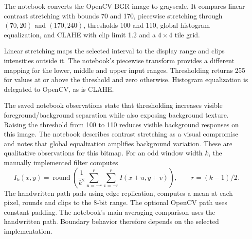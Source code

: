 The notebook converts the OpenCV BGR image to grayscale. It compares linear contrast stretching with bounds 70 and 170, piecewise stretching through $(70,20)$ and $(170,240)$, thresholds 100 and 110, global histogram equalization, and CLAHE with clip limit 1.2 and a $4\times4$ tile grid.

Linear stretching maps the selected interval to the display range and clips intensities outside it. The notebook's piecewise transform provides a different mapping for the lower, middle and upper input ranges. Thresholding returns 255 for values at or above the threshold and zero otherwise. Histogram equalization is delegated to OpenCV, as is CLAHE.

The saved notebook observations state that thresholding increases visible foreground/background separation while also exposing background texture. Raising the threshold from 100 to 110 reduces visible background responses on this image. The notebook describes contrast stretching as a visual compromise and notes that global equalization amplifies background variation. These are qualitative observations for this bitmap.
For an odd window width $k$, the manually implemented filter computes
\[
I_k(x,y)=\operatorname{round}\left(\frac{1}{k^2}\sum_{u=-r}^{r}\sum_{v=-r}^{r}I(x+u,y+v)\right),\qquad r=(k-1)/2.
\]
The handwritten path pads using edge replication, computes a mean at each pixel, rounds and clips to the 8-bit range. The optional OpenCV path uses constant padding. The notebook's main averaging comparison uses the handwritten path. Boundary behavior therefore depends on the selected implementation.

